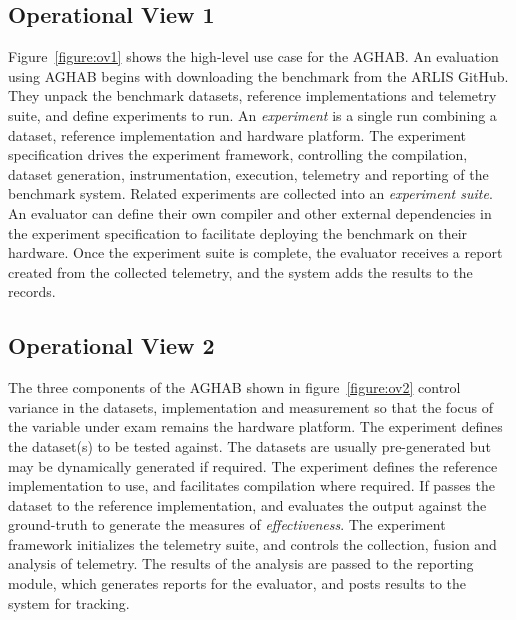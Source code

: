 \subsection{Operational View 1}
Figure~\ref{figure:ov1} shows the high-level use case for the AGHAB. 
An evaluation using AGHAB begins with downloading the benchmark from the ARLIS GitHub. 
They unpack the benchmark datasets, reference implementations and telemetry suite, and define experiments to run.
An \textit{experiment} is a single run combining a dataset, reference implementation and hardware platform.
The experiment specification drives the experiment framework, controlling the compilation, dataset generation, instrumentation, execution, telemetry and reporting of the benchmark system.
Related experiments are collected into an \textit{experiment suite}.
An evaluator can define their own compiler and other external dependencies in the experiment specification to facilitate deploying the benchmark on their hardware. 
Once the experiment suite is complete, the evaluator receives a report created from the collected telemetry, and the system adds the results to the records. 
\begin{figure*}
    \centering
    
    \label{figure:ov1}
    \caption{A user of the AGHAB provides their hardware, optionally any required compiler and a specification of the experiments to run.}
\end{figure*}
\begin{figure*}
    \centering
    
    \label{figure:ov2}
    \caption{The Experiment Framework reads the experiment specification and collects the specified datasets, the reference implementations and creates an experiment to task the baseline CPU, GPU and Graph Hardware Accelerators (GHA). It controls the data collection and report generation.}
\end{figure*}

\subsection{Operational View 2}
The three components of the AGHAB shown in figure~\ref{figure:ov2} control variance in the datasets, implementation and measurement so that the focus of the variable under exam remains the hardware platform. 
The experiment defines the dataset(s) to be tested against.
The datasets are usually pre-generated but may be dynamically generated if required. 
The experiment defines the reference implementation to use, and facilitates compilation where required.
If passes the dataset to the reference implementation, and evaluates the output against the ground-truth to generate the measures of \textit{effectiveness}.
The experiment framework initializes the telemetry suite, and controls the collection, fusion and analysis of telemetry. 
The results of the analysis are passed to the reporting module, which generates reports for the evaluator, and posts results to the system for tracking. 



